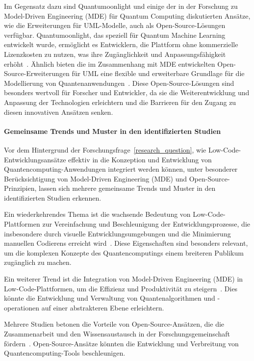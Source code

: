 Im Gegensatz dazu sind Quantumoonlight und einige der in der Forschung zu Model-Driven Engineering (MDE) für Quantum Computing 
diskutierten Ansätze, wie die Erweiterungen für UML-Modelle, auch als Open-Source-Lösungen verfügbar. Quantumoonlight, das speziell 
für Quantum Machine Learning entwickelt wurde, ermöglicht es Entwicklern, die Plattform ohne kommerzielle Lizenzkosten zu nutzen, 
was ihre Zugänglichkeit und Anpassungsfähigkeit erhöht~\cite{Amato_2023}. Ähnlich bieten die im Zusammenhang mit MDE entwickelten 
Open-Source-Erweiterungen für UML eine flexible und erweiterbare Grundlage für die Modellierung von Quantenanwendungen~\cite{gemeinhardt2021towards}. 
Diese Open-Source-Lösungen sind besonders wertvoll für Forscher und Entwickler, da sie die Weiterentwicklung und Anpassung der 
Technologien erleichtern und die Barrieren für den Zugang zu diesen innovativen Ansätzen senken.

% 

\paragraph{Gemeinsame Trends und Muster in den identifizierten Studien}

Vor dem Hintergrund der Forschungsfrage~\ref{research_question}, wie Low-Code-Entwicklungsansätze effektiv in die Konzeption 
und Entwicklung von Quantencomputing-Anwendungen integriert werden können, unter besonderer Berücksichtigung 
von Model-Driven Engineering (MDE) und Open-Source-Prinzipien, lassen sich mehrere gemeinsame Trends und 
Muster in den identifizierten Studien erkennen.

Ein wiederkehrendes Thema ist die wachsende Bedeutung von Low-Code-Plattformen zur Vereinfachung und 
Beschleunigung der Entwicklungsprozesse, die insbesondere durch visuelle Entwicklungsumgebungen und 
die Minimierung manuellen Codierens erreicht wird~\cite{Khorram_2020, Sahay_2020, Bock_2021}. Diese 
Eigenschaften sind besonders relevant, um die komplexen Konzepte des Quantencomputings einem breiteren Publikum zugänglich zu machen.

Ein weiterer Trend ist die Integration von Model-Driven Engineering (MDE) in Low-Code-Plattformen, 
um die Effizienz und Produktivität zu steigern~\cite{Gemeinhardt_2021, Moin_2021, Perez-Castillo_2022}. 
Dies könnte die Entwicklung und Verwaltung von Quantenalgorithmen und -operationen auf einer abstrakteren Ebene erleichtern.

Mehrere Studien betonen die Vorteile von Open-Source-Ansätzen, die die Zusammenarbeit und den Wissensaustausch 
in der Forschungsgemeinschaft fördern~\cite{Amato_2023, Gemeinhardt_2023}. Open-Source-Ansätze könnten die 
Entwicklung und Verbreitung von Quantencomputing-Tools beschleunigen.

